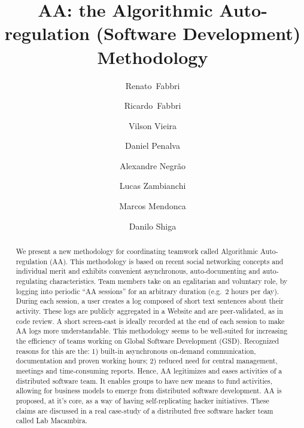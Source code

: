 \title{
    AA: the Algorithmic Auto-regulation (Software Development) Methodology
}

\author{%
Renato~Fabbri \and Ricardo~Fabbri \and Vilson Vieira \and Daniel Penalva \and Alexandre Negr\~{a}o \and Lucas Zambianchi
\and Marcos Mendonca \and Danilo Shiga
}

\maketitle

\begin{abstract}
We present a new methodology for coordinating teamwork called Algorithmic
Auto-regulation (AA). This methodology is based on recent social networking
concepts and individual merit and exhibits convenient asynchronous,
auto-documenting and auto-regulating characteristics. Team members take on an
egalitarian and voluntary role, by logging into periodic ``AA sessions'' for an
arbitrary duration (e.g.\ 2 hours per day).  During each session, a user creates
a log composed of short text sentences about their activity. These logs are
publicly aggregated in a Website and are peer-validated, as in code review. A
short screen-cast is ideally recorded at the end of each session to make AA logs
more understandable. This methodology seems to be well-suited for increasing the
efficiency of teams working on Global Software Development (GSD). Recognized
reasons for this are the: 1) built-in asynchronous on-demand communication,
documentation and proven working hours; 2) reduced need for central management,
meetings and time-consuming reports. Hence, AA legitimizes and eases activities
of a distributed software team.  It enables groups to have new means to fund
activities, allowing for business models to emerge from distributed software
development. AA is proposed, at it's core, as a way of having self-replicating
hacker initiatives. These claims are discussed in a real case-study of a
distributed free software hacker team called Lab Macambira.
\end{abstract}

